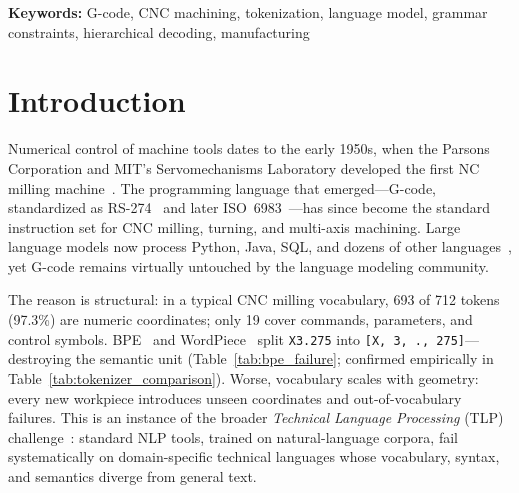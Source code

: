\documentclass[11pt]{article}
\begin{document}
\begin{abstract}
Under 5-fold cross-validation on the full curriculum-trained pipeline, the hierarchical decoder reaches 94.7\% token accuracy and 86.5\% sequence exact-match, a 19.8-point improvement over a flat 712-class baseline on the same architecture. Structural predictions exceed 96\% and numeric digit prediction reaches 91.1\%. A slim cross-entropy trainer used for the apples-to-apples cross-tokenizer experiments (Section~\ref{sec:exp_c}) reaches a lower absolute accuracy; we report both regimes separately and do not conflate them.
\end{abstract}

\medskip\noindent\textbf{Keywords:} G-code, CNC machining, tokenization, language model, grammar constraints, hierarchical decoding, manufacturing

\section{Introduction}
\label{sec:introduction}

Numerical control of machine tools dates to the early 1950s, when the Parsons Corporation and MIT's Servomechanisms Laboratory developed the first NC milling machine~\cite{parsons_nc}. The programming language that emerged---G-code, standardized as RS-274~\cite{rs274d} and later ISO~6983~\cite{iso6983}---has since become the standard instruction set for CNC milling, turning, and multi-axis machining. Large language models now process Python, Java, SQL, and dozens of other languages~\cite{codex,codellama,starcoder}, yet G-code remains virtually untouched by the language modeling community.

The reason is structural: in a typical CNC milling vocabulary, 693 of 712 tokens (97.3\%) are numeric coordinates; only 19 cover commands, parameters, and control symbols. BPE~\cite{bpe} and WordPiece~\cite{wordpiece} split \texttt{X3.275} into \texttt{[X, 3, ., 275]}---destroying the semantic unit (Table~\ref{tab:bpe_failure}; confirmed empirically in Table~\ref{tab:tokenizer_comparison}). Worse, vocabulary scales with geometry: every new workpiece introduces unseen coordinates and out-of-vocabulary failures. This is an instance of the broader \emph{Technical Language Processing} (TLP) challenge~\cite{tlp_foundational}: standard NLP tools, trained on natural-language corpora, fail systematically on domain-specific technical languages whose vocabulary, syntax, and semantics diverge from general text.
\end{document}
